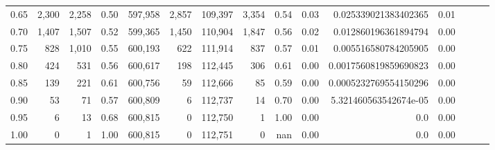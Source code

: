 \begin{tabular}{rrrrrrrrrrrrrrr}
0.65 &    2,300 &   2,258 &  0.50 &  597,958 &    2,857 &  109,397 &    3,354 &  0.54 &  0.03 &   0.025339021383402365 &      0.01 \\
0.70 &    1,407 &   1,507 &  0.52 &  599,365 &    1,450 &  110,904 &    1,847 &  0.56 &  0.02 &   0.012860196361894794 &      0.00 \\
0.75 &      828 &   1,010 &  0.55 &  600,193 &      622 &  111,914 &      837 &  0.57 &  0.01 &   0.005516580784205905 &      0.00 \\
0.80 &      424 &     531 &  0.56 &  600,617 &      198 &  112,445 &      306 &  0.61 &  0.00 &  0.0017560819859690823 &      0.00 \\
0.85 &      139 &     221 &  0.61 &  600,756 &       59 &  112,666 &       85 &  0.59 &  0.00 &  0.0005232769554150296 &      0.00 \\
0.90 &       53 &      71 &  0.57 &  600,809 &        6 &  112,737 &       14 &  0.70 &  0.00 &  5.321460563542674e-05 &      0.00 \\
0.95 &        6 &      13 &  0.68 &  600,815 &        0 &  112,750 &        1 &  1.00 &  0.00 &                    0.0 &      0.00 \\
1.00 &        0 &       1 &  1.00 &  600,815 &        0 &  112,751 &        0 &   nan &  0.00 &                    0.0 &      0.00 \\
\bottomrule
\end{tabular}
